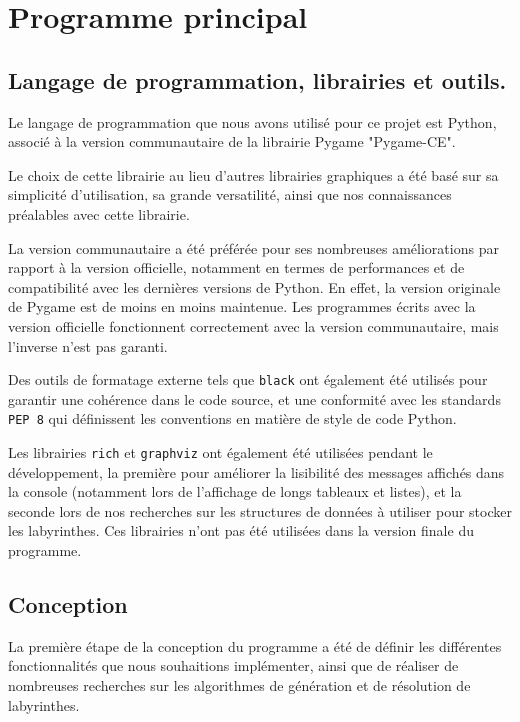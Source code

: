 \documentclass[12pt]{scrreprt} %
\begin{document}
\section{Programme principal}

\subsection{Langage de programmation, librairies et outils.}

Le langage de programmation que nous avons utilisé pour ce projet est Python, associé à la version communautaire de la librairie Pygame "Pygame-CE"\cite{PygameGithub2024}.

Le choix de cette librairie au lieu d'autres librairies graphiques a été basé sur sa simplicité d'utilisation, sa grande versatilité, ainsi que nos connaissances préalables avec cette librairie.

La version communautaire a été préférée pour ses nombreuses améliorations par rapport à la version officielle, notamment en termes de performances et de compatibilité avec les dernières versions de Python. En effet, la version originale de Pygame est de moins en moins maintenue. Les programmes écrits avec la version officielle fonctionnent correctement avec la version communautaire, mais l'inverse n'est pas garanti.

Des outils de formatage externe tels que \texttt{black}\cite{Black2024} ont également été utilisés pour garantir une cohérence dans le code source, et une conformité avec les standards \texttt{PEP 8}\cite{PEP82024} qui définissent les conventions en matière de style de code Python.

Les librairies \texttt{rich} et \texttt{graphviz} ont également été utilisées pendant le développement, la première pour améliorer la lisibilité des messages affichés dans la console (notamment lors de l'affichage de longs tableaux et listes), et la seconde lors de nos recherches sur les structures de données à utiliser pour stocker les labyrinthes. Ces librairies n'ont pas été utilisées dans la version finale du programme.

\subsection{Conception}

La première étape de la conception du programme a été de définir les différentes fonctionnalités que nous souhaitions implémenter, ainsi que de réaliser de nombreuses recherches sur les algorithmes de génération et de résolution de labyrinthes.
\end{document}
